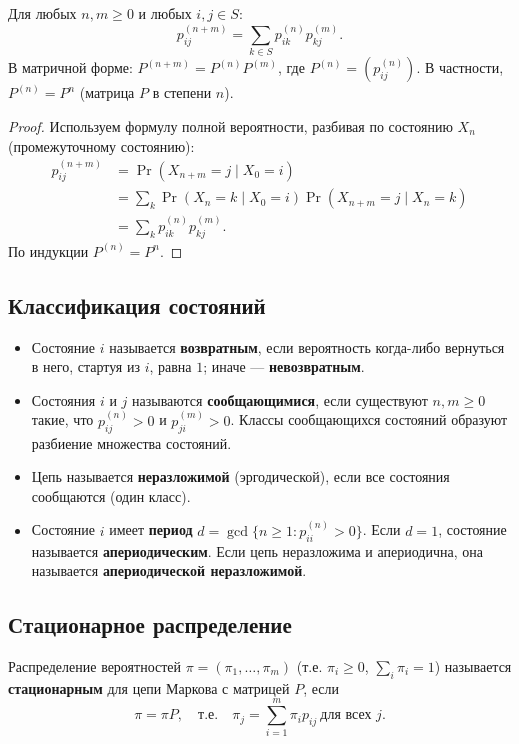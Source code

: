\documentclass[10pt]{article}
\begin{document}
\begin{theorem}
Для любых $n,m \ge 0$ и любых $i,j \in S$:
\[
p_{ij}^{(n+m)} = \sum_{k \in S} p_{ik}^{(n)} p_{kj}^{(m)}.
\]
В матричной форме: $P^{(n+m)} = P^{(n)} P^{(m)}$, где $P^{(n)} = (p_{ij}^{(n)})$. В частности, $P^{(n)} = P^n$ (матрица $P$ в степени $n$).
\end{theorem}
\begin{proof}
Используем формулу полной вероятности, разбивая по состоянию $X_n$ (промежуточному состоянию):
\begin{align*}
   p_{ij}^{(n+m)} &= \Pr(X_{n+m}=j \mid X_0=i)\\
   &= \sum_{k} \Pr(X_n=k \mid X_0=i) \Pr(X_{n+m}=j \mid X_n=k) \\
   &= \sum_{k} p_{ik}^{(n)} p_{kj}^{(m)}.
\end{align*}
По индукции $P^{(n)} = P^n$.
\end{proof}

\subsection{Классификация состояний}
\begin{itemize}
    \item Состояние $i$ называется \textbf{возвратным}, если вероятность когда-либо вернуться в него, стартуя из $i$, равна $1$; иначе — \textbf{невозвратным}.
    \item Состояния $i$ и $j$ называются \textbf{сообщающимися}, если существуют $n,m \ge 0$ такие, что $p_{ij}^{(n)} > 0$ и $p_{ji}^{(m)} > 0$. Классы сообщающихся состояний образуют разбиение множества состояний.
    \item Цепь называется \textbf{неразложимой} (эргодической), если все состояния сообщаются (один класс).
    \item Состояние $i$ имеет \textbf{период} $d = \gcd\{ n \ge 1 : p_{ii}^{(n)} > 0\}$. Если $d=1$, состояние называется \textbf{апериодическим}. Если цепь неразложима и апериодична, она называется \textbf{апериодической неразложимой}.
\end{itemize}

\subsection{Стационарное распределение}

\begin{definition}
Распределение вероятностей $\pi = (\pi_1,\dots,\pi_m)$ (т.е. $\pi_i \ge 0$, $\sum_i \pi_i = 1$) называется \textbf{стационарным} для цепи Маркова с матрицей $P$, если
\[
\pi = \pi P, \quad \text{т.е.} \quad \pi_j = \sum_{i=1}^m \pi_i p_{ij} \ \text{для всех } j.
\]
\end{definition}
\end{document}
